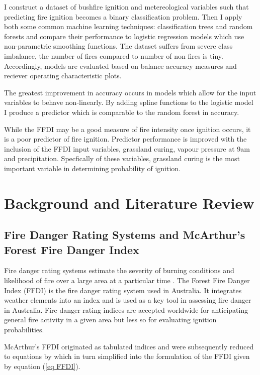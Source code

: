 \documentclass[11pt,a4paper]{article}
\begin{document}
I construct a dataset of bushfire ignition and metereological variables such that predicting fire ignition becomes a binary classification problem. Then I apply both some common machine learning techniques: classification trees and random forests and compare their performance to logistic regression models which use non-parametric smoothing functions. The dataset suffers from severe class imbalance, the number of fires compared to number of non fires is tiny. Accordingly, models are evaluated based on balance accuracy measures and reciever operating characteristic plots. 

 The greatest improvement in accuracy occurs in models which allow for the input variables to behave non-linearly. By adding spline functions to the logistic model I produce a predictor which is comparable to the random forest in accuracy. 

While the FFDI may be a good measure of fire intensity once ignition occurs, it is a poor predictor of fire ignition. Predictor performance is improved with the inclusion of the FFDI input variables, grassland curing, vapour pressure at 9am and precipitation. Specfically of these variables, grassland curing is the most important variable in determining probability of ignition. 


\section{Background and Literature Review}

\subsection{Fire Danger Rating Systems and McArthur's Forest Fire Danger Index}
Fire danger rating systems estimate the severity of burning conditions and likelihood of fire over a large area at a particular time \citep{chandler83, andrews03}. The Forest Fire Danger Index (FFDI) \citep{mcarthur67} is the fire danger rating system used in Australia. It integrates weather elements into an index and is used as a key tool in assessing fire danger in Australia. Fire danger rating indices are accepted worldwide for anticipating general fire activity in a given area but less so for evaluating ignition probabilities. 

McArthur’s FFDI originated as tabulated indices and were subsequently reduced to equations by \citet{noble80} which in turn simplified into the formulation of the FFDI given by equation (\ref{eq FFDI}). 
\end{document}
